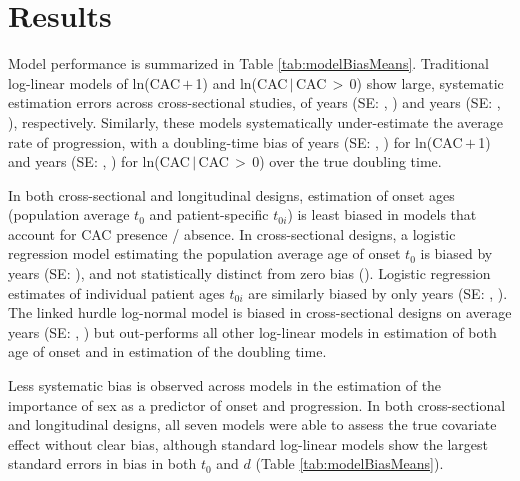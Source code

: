\documentclass[aps,pre,twocolumn,twoside,tightenlines,groupedaddress,amsmath,amssymb,nobibnotes,final,showkeys,letterpaper]{revtex4-2}
\begin{document}
\section{Results}

Model performance is summarized in Table \ref{tab:modelBiasMeans}. Traditional log-linear models of ln(CAC\,$+$\,1) and ln(CAC\,$|$\,CAC\,$>$\,0) show large, systematic estimation errors across cross-sectional studies, of \biasLNPCrossOnsetEst{} years (SE: \biasLNPCrossOnsetSE, \biasLNPCrossOnsetP) and \biasLNCrossOnsetEst{} years (SE: \biasLNCrossOnsetSE, \biasLNCrossOnsetP), respectively. Similarly, these models systematically under-estimate the average rate of progression, with a doubling-time bias of \biasLNPCrossProgEst{} years (SE: \biasLNPCrossProgSE, \biasLNPCrossProgP) for ln(CAC\,$+$\,1) and \biasLNCrossProgEst{} years (SE: \biasLNCrossProgSE, \biasLNCrossProgP) for ln(CAC\,$|$\,CAC\,$>$\,0) over the true doubling time.

In both cross-sectional and longitudinal designs, estimation of onset ages (population average $t_0$ and patient-specific $t_{0i}$) is least biased in models that account for CAC presence / absence. In cross-sectional designs, a logistic regression model estimating the population average age of onset $t_0$ is biased by \biasLogitCrossOnsetEst{} years (SE: \biasLogitCrossOnsetSE), and not statistically distinct from zero bias (\biasLogitCrossOnsetP). Logistic regression estimates of individual patient ages $t_{0i}$ are similarly biased by only \biasHurdleCrossOnsetEst{} years (SE: \biasHurdleCrossOnsetSE, \biasHurdleCrossOnsetP). The linked hurdle log-normal model is biased in cross-sectional designs on average \biasLHLNCrossOnsetEst{} years (SE: \biasLHLNCrossOnsetSE, \biasLHLNCrossOnsetP) but out-performs all other log-linear models in estimation of both age of onset and in estimation of the doubling time.

Less systematic bias is observed across models in the estimation of the importance of sex as a predictor of onset and progression. In both cross-sectional and longitudinal designs, all seven models were able to assess the true covariate effect without clear bias, although standard log-linear models show the largest standard errors in bias in both $t_0$ and $d$ (Table \ref{tab:modelBiasMeans}).
\end{document}
